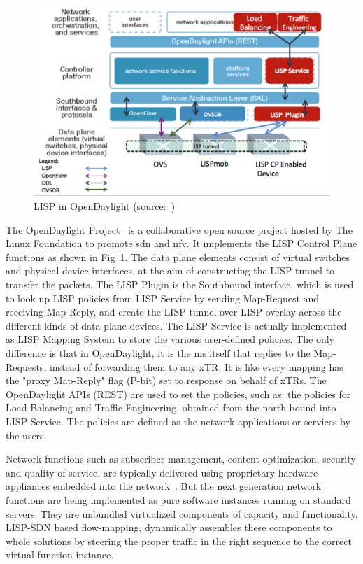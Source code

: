 \begin{figure}[!t]
	\centering
	\includegraphics[width=\textwidth]{Pics/LISP_in_OpenDaylight.eps}
	\caption{LISP in OpenDaylight (source:~\cite{LISP_ODLSummit_2014})}
	\label{LISP_in_OpenDaylight}
\end{figure}
The OpenDaylight Project~\cite{OpenDaylight} is a collaborative open source project hosted by The Linux Foundation to promote \acrfull{sdn} and \acrfull{nfv}. It implements the LISP Control Plane functions as shown in Fig~\ref{LISP_in_OpenDaylight}. The data plane elements consist of virtual switches and physical device interfaces, at the aim of constructing the LISP tunnel to transfer the packets. The LISP Plugin is the Southbound interface, which is used to look up LISP policies from LISP Service by sending Map-Request and receiving Map-Reply, and create the LISP tunnel over LISP overlay across the different kinds of data plane devices. The LISP Service is actually implemented as LISP Mapping System to store the various user-defined policies. The only difference is that in OpenDaylight, it is the \acrshort{ms} itself that replies to the Map-Requests, instead of forwarding them to any xTR. It is like every mapping has the "proxy Map-Reply" flag (P-bit) set to response on behalf of xTRs. The OpenDaylight APIs (REST) are used to set the policies, such as: the policies for Load Balancing and Traffic Engineering, obtained from the north bound into LISP Service. The policies are defined as the network applications or services by the users.

Network functions such as subscriber-management, content-optimization, security and quality of service, are typically delivered using proprietary hardware appliances embedded into the network~\cite{barkai2017lisp}. But the next generation network functions are being implemented as pure software instances running on standard servers. They are unbundled virtualized components of capacity and functionality. LISP-SDN based flow-mapping, dynamically assembles these components to whole solutions by steering the proper traffic in the right sequence to the correct virtual function instance.
